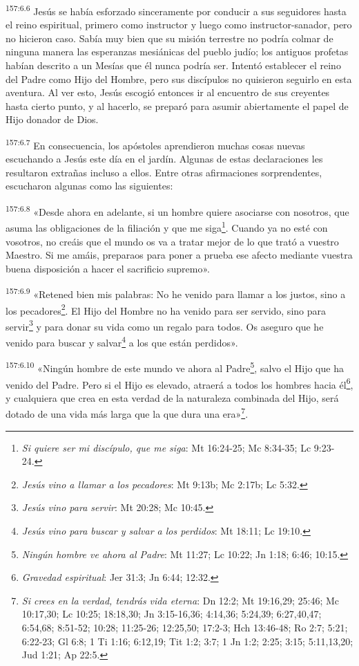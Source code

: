 \par
\textsuperscript{157:6.6} Jesús se había esforzado sinceramente por conducir a sus seguidores hasta el reino espiritual, primero como instructor y luego como instructor-sanador, pero no hicieron caso. Sabía muy bien que su misión terrestre no podría colmar de ninguna manera las esperanzas mesiánicas del pueblo judío; los antiguos profetas habían descrito a un Mesías que él nunca podría ser. Intentó establecer el reino del Padre como Hijo del Hombre, pero sus discípulos no quisieron seguirlo en esta aventura. Al ver esto, Jesús escogió entonces ir al encuentro de sus creyentes hasta cierto punto, y al hacerlo, se preparó para asumir abiertamente el papel de Hijo donador de Dios.

\par
\textsuperscript{157:6.7} En consecuencia, los apóstoles aprendieron muchas cosas nuevas escuchando a Jesús este día en el jardín. Algunas de estas declaraciones les resultaron extrañas incluso a ellos. Entre otras afirmaciones sorprendentes, escucharon algunas como las siguientes:

\par
\textsuperscript{157:6.8} «Desde ahora en adelante, si un hombre quiere asociarse con nosotros, que asuma las obligaciones de la filiación y que me siga\footnote{\textit{Si quiere ser mi discípulo, que me siga}: Mt 16:24-25; Mc 8:34-35; Lc 9:23-24.}. Cuando ya no esté con vosotros, no creáis que el mundo os va a tratar mejor de lo que trató a vuestro Maestro. Si me amáis, preparaos para poner a prueba ese afecto mediante vuestra buena disposición a hacer el sacrificio supremo».

\par
\textsuperscript{157:6.9} «Retened bien mis palabras: No he venido para llamar a los justos, sino a los pecadores\footnote{\textit{Jesús vino a llamar a los pecadores}: Mt 9:13b; Mc 2:17b; Lc 5:32.}. El Hijo del Hombre no ha venido para ser servido, sino para servir\footnote{\textit{Jesús vino para servir}: Mt 20:28; Mc 10:45.} y para donar su vida como un regalo para todos. Os aseguro que he venido para buscar y salvar\footnote{\textit{Jesús vino para buscar y salvar a los perdidos}: Mt 18:11; Lc 19:10.} a los que están perdidos».

\par
\textsuperscript{157:6.10} «Ningún hombre de este mundo ve ahora al Padre\footnote{\textit{Ningún hombre ve ahora al Padre}: Mt 11:27; Lc 10:22; Jn 1:18; 6:46; 10:15.}, salvo el Hijo que ha venido del Padre. Pero si el Hijo es elevado, atraerá a todos los hombres hacia él\footnote{\textit{Gravedad espiritual}: Jer 31:3; Jn 6:44; 12:32.}, y cualquiera que crea en esta verdad de la naturaleza combinada del Hijo, será dotado de una vida más larga que la que dura una era»\footnote{\textit{Si crees en la verdad, tendrás vida eterna}: Dn 12:2; Mt 19:16,29; 25:46; Mc 10:17,30; Lc 10:25; 18:18,30; Jn 3:15-16,36; 4:14,36; 5:24,39; 6:27,40,47; 6:54,68; 8:51-52; 10:28; 11:25-26; 12:25,50; 17:2-3; Hch 13:46-48; Ro 2:7; 5:21; 6:22-23; Gl 6:8; 1 Ti 1:16; 6:12,19; Tit 1:2; 3:7; 1 Jn 1:2; 2:25; 3:15; 5:11,13,20; Jud 1:21; Ap 22:5.}.

